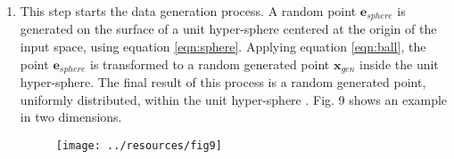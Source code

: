 \documentclass[parskip=full]{scrartcl}
\begin{document}
\begin{enumerate}
	\item This step starts the data generation process. A random point \( \textbf{e}_{sphere} \) is generated on the surface of a unit hyper-sphere centered at the origin of the input space, using equation \eqref{eqn:sphere}. Applying equation \eqref{eqn:ball}, the point \( \textbf{e}_{sphere} \) is transformed to a random generated point \( \textbf{x}_{gen} \) inside the unit hyper-sphere. The final result of this process is a random generated point, uniformly distributed, within the unit hyper-sphere \cite{DasGupta2011}. Fig. 9 shows an example in two dimensions.

	\begin{figure}[H]
		\centering
		\texttt{[image: ../resources/fig9]}
	\end{figure}


\end{enumerate}
\end{document}
